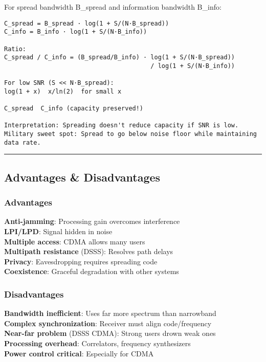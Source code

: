 For spread bandwidth B\_spread and information bandwidth B\_info:

\begin{verbatim}
C_spread = B_spread · log(1 + S/(N·B_spread))
C_info = B_info · log(1 + S/(N·B_info))

Ratio:
C_spread / C_info = (B_spread/B_info) · log(1 + S/(N·B_spread)) 
                                        / log(1 + S/(N·B_info))

For low SNR (S << N·B_spread):
log(1 + x)  x/ln(2)  for small x

C_spread  C_info (capacity preserved!)

Interpretation: Spreading doesn't reduce capacity if SNR is low.
Military sweet spot: Spread to go below noise floor while maintaining data rate.
\end{verbatim}

\begin{center}\rule{0.5\linewidth}{0.5pt}\end{center}

\subsection{\texorpdfstring{ Advantages \&
Disadvantages}{ Advantages \& Disadvantages}}\label{advantages-disadvantages}

\subsubsection{Advantages}\label{advantages}

\textbf{Anti-jamming}: Processing gain overcomes interference\\
\textbf{LPI/LPD}: Signal hidden in noise\\
\textbf{Multiple access}: CDMA allows many users\\
\textbf{Multipath resistance} (DSSS): Resolves path delays\\
\textbf{Privacy}: Eavesdropping requires spreading code\\
\textbf{Coexistence}: Graceful degradation with other systems

\subsubsection{Disadvantages}\label{disadvantages}

\textbf{Bandwidth inefficient}: Uses far more spectrum than narrowband\\
\textbf{Complex synchronization}: Receiver must align code/frequency\\
\textbf{Near-far problem} (DSSS CDMA): Strong users drown weak ones\\
\textbf{Processing overhead}: Correlators, frequency synthesizers\\
\textbf{Power control critical}: Especially for CDMA

